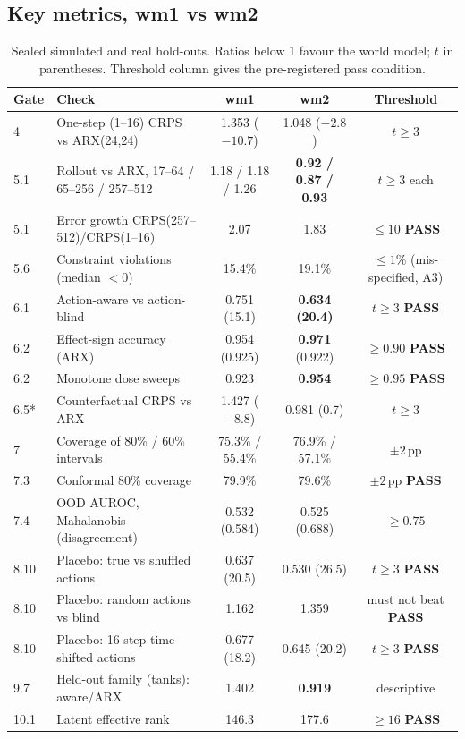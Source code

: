 \documentclass[10pt,a4paper]{extarticle}
\newcommand{\pass}{\textcolor{good}{\textbf{PASS}}}
\begin{document}
\subsection{Key metrics, wm1 vs wm2}
\begin{table}[H]
\centering\small
\caption{Sealed simulated and real hold-outs. Ratios below 1 favour the world model; $t$ in parentheses.
Threshold column gives the pre-registered pass condition.}
\label{tab:wm}
\setlength{\tabcolsep}{4pt}
\begin{tabular}{@{}llccc@{}}
\toprule
Gate & Check & wm1 & wm2 & Threshold \\
\midrule
4 & One-step (1--16) CRPS vs ARX(24,24) & 1.353 ($-10.7$) & 1.048 ($-2.8$) & $t\ge3$ \\
5.1 & Rollout vs ARX, 17--64 / 65--256 / 257--512 & 1.18 / 1.18 / 1.26 & \textbf{0.92 / 0.87 / 0.93} & $t\ge3$ each \\
5.1 & Error growth CRPS(257--512)/CRPS(1--16) & 2.07 & 1.83 & $\le10$ \pass \\
5.6 & Constraint violations (median $<0$) & 15.4\% & 19.1\% & $\le1\%$ (mis-specified, A3) \\
6.1 & Action-aware vs action-blind & 0.751 (15.1) & \textbf{0.634 (20.4)} & $t\ge3$ \pass \\
6.2 & Effect-sign accuracy (ARX) & 0.954 (0.925) & \textbf{0.971} (0.922) & $\ge0.90$ \pass \\
6.2 & Monotone dose sweeps & 0.923 & \textbf{0.954} & $\ge0.95$ \pass \\
6.5* & Counterfactual CRPS vs ARX & 1.427 ($-8.8$) & 0.981 (0.7) & $t\ge3$ \\
7 & Coverage of 80\% / 60\% intervals & 75.3\% / 55.4\% & 76.9\% / 57.1\% & $\pm2$\,pp \\
7.3 & Conformal 80\% coverage & 79.9\% & 79.6\% & $\pm2$\,pp \pass \\
7.4 & OOD AUROC, Mahalanobis (disagreement) & 0.532 (0.584) & 0.525 (0.688) & $\ge0.75$ \\
8.10 & Placebo: true vs shuffled actions & 0.637 (20.5) & 0.530 (26.5) & $t\ge3$ \pass \\
8.10 & Placebo: random actions vs blind & 1.162 & 1.359 & must not beat \pass \\
8.10 & Placebo: 16-step time-shifted actions & 0.677 (18.2) & 0.645 (20.2) & $t\ge3$ \pass \\
9.7 & Held-out family (tanks): aware/ARX & 1.402 & \textbf{0.919} & descriptive \\
10.1 & Latent effective rank & 146.3 & 177.6 & $\ge16$ \pass \\

\end{tabular}
\end{table}
\end{document}
